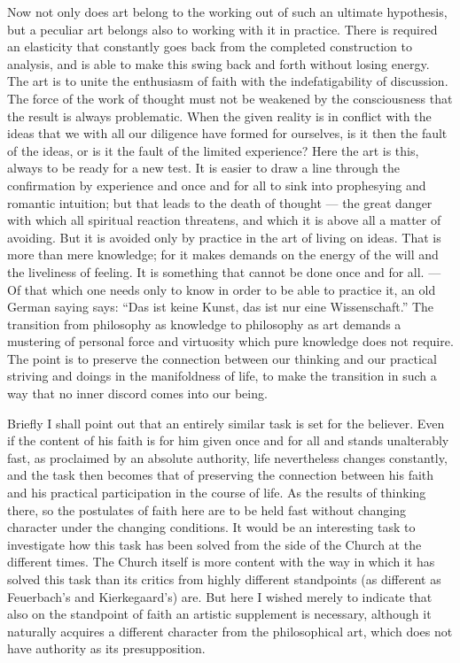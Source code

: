 \documentclass[12pt,a4paper,openany]{book}
\newcommand{\opage}[1]{\marginnote{\footnotesize\textit{[#1]}}}
\begin{document}
Now not only does art belong to the working out of such an
ultimate hypothesis, but a peculiar
art belongs also to working with it in practice. There is required an
elasticity that constantly goes back from the completed construction
to analysis, and is able to make this swing
back and forth without losing energy. The art is to
unite the enthusiasm of faith with the indefatigability of discussion.
The force of the work of thought must not be weakened by the consciousness
that the result is always problematic. When the given
reality is in conflict with the ideas that we with all our diligence
have formed for ourselves, is it then the fault of the ideas, or is it the
fault of the limited experience? Here the art is this, always
to be ready for a new test. It is easier to draw a
\opage{185}line through the confirmation by experience and once and for all to sink into
prophesying and romantic intuition; but that leads to the death
of thought --- the great danger with which all spiritual reaction threatens,
and which it is above all a matter of avoiding. But it
is avoided only by practice in the art of living on ideas.
That is more than mere knowledge; for it makes demands on the energy of the will
and the liveliness of feeling. It is something that cannot
be done once and for all. --- Of that which one needs only
to know in order to be able to practice it, an old German
saying says: ``Das ist keine Kunst, das ist nur eine
Wissenschaft.'' The transition from philosophy as knowledge to philosophy
as art demands a mustering of personal force and
virtuosity which pure knowledge does not require. The point is to
preserve the connection between our thinking and our
practical striving and doings in the manifoldness of life, to make the
transition in such a way that no inner discord comes into our
being.

Briefly I shall point out that an entirely similar
task is set for the believer. Even if the content of his faith is for
him given once and for all and stands unalterably fast,
as proclaimed by an absolute authority, life nevertheless
changes constantly, and the task then becomes that of preserving
the connection between his faith and his practical participation
in the course of life. As the results of thinking there, so
the postulates of faith here are to be held fast without changing character
under the changing conditions. It would be an interesting
task to investigate how this task has been solved from
the side of the Church at the different times. The Church itself is more
content with the way in which it has solved this
task than its critics from highly different
standpoints (as different as Feuerbach's and Kierkegaard's) are.
But here I wished merely to indicate that also on the standpoint
of faith an artistic supplement is necessary, although
it naturally acquires a different character from the philosophical
art, which does not have authority as its presupposition.
\end{document}
